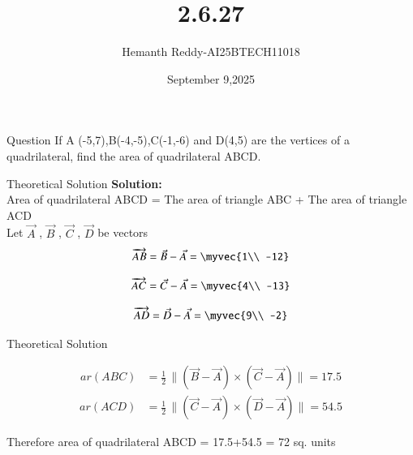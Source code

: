 \documentclass{beamer}
\title %
{2.6.27}
\date{September 9,2025}
\author %
{Hemanth Reddy-AI25BTECH11018}
\begin{document}
\frame{\titlepage}
\begin{frame}{Question}
If A (-5,7),B(-4,-5),C(-1,-6) and D(4,5) are the vertices of a quadrilateral, find
 the area of quadrilateral ABCD.
\end{frame}



\begin{frame}{Theoretical Solution}
\textbf{Solution:}\\
Area of quadrilateral ABCD = The area of triangle ABC + The area of triangle ACD\\Let 
$\vec{A}$ ,
$\vec{B}$ ,
$\vec{C}$ ,
$\vec{D}$ 
be vectors\\
\begin{align}
    \overrightarrow{AB} =   \vec{B}  -  \vec{A}  =  \myvec{1\\
-12}
\end{align}

\begin{align}
    \overrightarrow{AC}  =   \vec{C}   -   \vec{A}   =  \myvec{4\\
-13}
\end{align}
 
\begin{align}
    \overrightarrow{AD}  =   \vec{D}   -   \vec{A}   =  \myvec{9\\
-2}
\end{align}
 




\end{frame}

\begin{frame}{Theoretical Solution}

\begin{align}
ar(ABC) &= \frac{1}{2} \, \|(\vec{B} - \vec{A}) \times (\vec{C} - \vec{A}) \|  =  17.5
\end{align}
\begin{align}
ar(ACD) &= \frac{1}{2} \, \|(\vec{C} - \vec{A}) \times (\vec{D} - \vec{A}) \|  =  54.5
\end{align}

Therefore area of quadrilateral ABCD = 17.5+54.5 = 72 sq. units



\end{frame}
\end{document}
